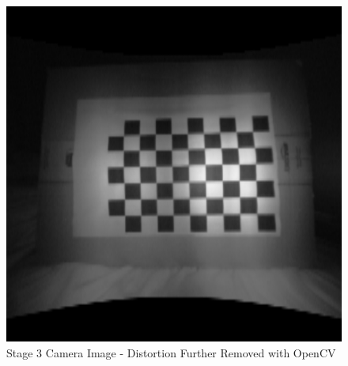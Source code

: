 \documentclass[11pt,oneside]{report}
\begin{document}
		\begin{figure}
			\centering
    				\includegraphics[scale=0.5]{3}
    				\caption{Stage 3 Camera Image - Distortion Further Removed with OpenCV \protect {\label{fig:image_3}}}

		\end{figure}	
		
\end{document}
